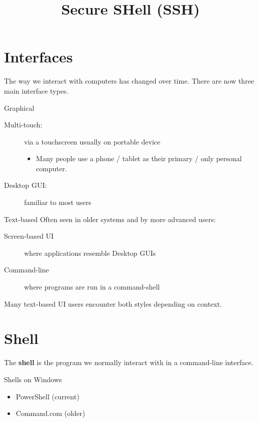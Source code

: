 \documentclass[slides]{pgnotes}
\title{Secure SHell (SSH)}
\begin{document}
\maketitle

\tableofcontents

\section{Interfaces}

The way we interact with computers has changed over time.
There are now three main interface types.

\begin{bluebox}{Graphical}
\begin{description}
  
\item[Multi-touch:] via a touchscreen usually on portable device 
  \begin{itemize}
  \item Many people use a phone / tablet as their primary / only personal computer.
  \end{itemize}

\item[Desktop GUI:] familiar to most users
\end{description}
\end{bluebox}
 
\begin{bluebox}{Text-based}
Often seen in older systems and by more advanced users:

  \begin{description}
  \item[Screen-based UI] where applications resemble Desktop GUIs
  \item[Command-line] where programs are run in a command-shell
  \end{description}

  Many text-based UI users encounter both styles depending on context.
\end{bluebox}

\section{Shell}

The \textbf{shell} is the program we normally interact with in a command-line interface.

\begin{bluebox}{Shells on Windows}
  \begin{itemize}
  \item PowerShell (current)
  \item Command.com (older)
  \end{itemize}
\end{bluebox}
\end{document}
